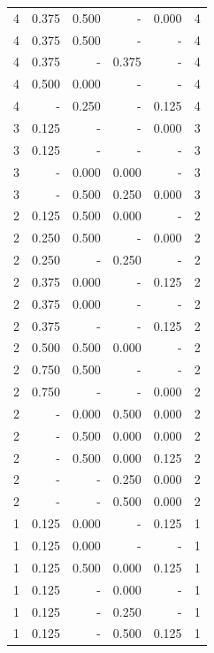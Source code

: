 \documentclass[a4paper]{article}\usepackage[]{graphicx}\usepackage[]{color}
\begin{document}
\begin{table}[ht]
\begin{tabular}{rrrrrr}
  4 & 0.375 & 0.500 & - & 0.000 & 4 \\ 
  4 & 0.375 & 0.500 & - & - & 4 \\ 
   \rowcolor{sosoColor} 4 & 0.375 & - & 0.375 & - & 4 \\ 
  4 & 0.500 & 0.000 & - & - & 4 \\ 
  4 & - & 0.250 & - & 0.125 & 4 \\ 
   \rowcolor{nullColor} 3 & 0.125 & - & - & 0.000 & 3 \\ 
   \rowcolor{nullColor} 3 & 0.125 & - & - & - & 3 \\ 
   \rowcolor{goodColor} 3 & - & 0.000 & 0.000 & - & 3 \\ 
   \rowcolor{badColor} 3 & - & 0.500 & 0.250 & 0.000 & 3 \\ 
   \rowcolor{badColor} 2 & 0.125 & 0.500 & 0.000 & - & 2 \\ 
  2 & 0.250 & 0.500 & - & 0.000 & 2 \\ 
   \rowcolor{sosoColor} 2 & 0.250 & - & 0.250 & - & 2 \\ 
  2 & 0.375 & 0.000 & - & 0.125 & 2 \\ 
  2 & 0.375 & 0.000 & - & - & 2 \\ 
   \rowcolor{nullColor} 2 & 0.375 & - & - & 0.125 & 2 \\ 
   \rowcolor{badColor} 2 & 0.500 & 0.500 & 0.000 & - & 2 \\ 
  2 & 0.750 & 0.500 & - & - & 2 \\ 
   \rowcolor{nullColor} 2 & 0.750 & - & - & 0.000 & 2 \\ 
   \rowcolor{badColor} 2 & - & 0.000 & 0.500 & 0.000 & 2 \\ 
   \rowcolor{badColor} 2 & - & 0.500 & 0.000 & 0.000 & 2 \\ 
   \rowcolor{badColor} 2 & - & 0.500 & 0.000 & 0.125 & 2 \\ 
   \rowcolor{sosoColor} 2 & - & - & 0.250 & 0.000 & 2 \\ 
   \rowcolor{sosoColor} 2 & - & - & 0.500 & 0.000 & 2 \\ 
  1 & 0.125 & 0.000 & - & 0.125 & 1 \\ 
  1 & 0.125 & 0.000 & - & - & 1 \\ 
   \rowcolor{badColor} 1 & 0.125 & 0.500 & 0.000 & 0.125 & 1 \\ 
   \rowcolor{sosoColor} 1 & 0.125 & - & 0.000 & - & 1 \\ 
   \rowcolor{sosoColor} 1 & 0.125 & - & 0.250 & - & 1 \\ 
   \rowcolor{sosoColor} 1 & 0.125 & - & 0.500 & 0.125 & 1 \\ 

\end{tabular}
\end{table}
\end{document}

